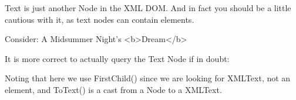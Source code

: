 Text is just another Node in the X\+M\+L D\+O\+M. And in fact you should be a little cautious with it, as text nodes can contain elements.

\begin{DoxyVerb}Consider: A Midsummer Night's <b>Dream</b>
\end{DoxyVerb}


It is more correct to actually query the Text Node if in doubt\+:


\begin{DoxyCodeInclude}

\end{DoxyCodeInclude}


Noting that here we use First\+Child() since we are looking for X\+M\+L\+Text, not an element, and To\+Text() is a cast from a Node to a X\+M\+L\+Text. 